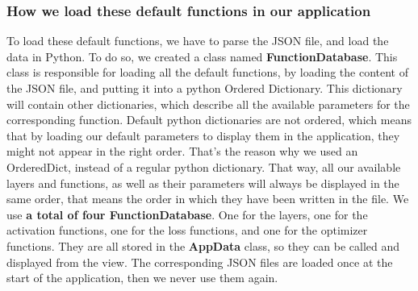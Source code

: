 \subsubsection{How we load these default functions in our application}
To load these default functions, we have to parse the JSON file, and load the data in Python.
To do so, we created a class named \textbf{FunctionDatabase}. This class is responsible for loading all the default functions, by loading the content of the JSON file, and putting it into a python Ordered Dictionary. This dictionary will contain other dictionaries, which describe all the available parameters for the corresponding function. Default python dictionaries are not ordered, which means that by loading our default parameters to display them in the application, they might not appear in the right order. That's the reason why we used an OrderedDict, instead of a regular python dictionary. That way, all our available layers and functions, as well as their parameters will always be displayed in the same order, that means the order in which they have been written in the file.
\newline We use \textbf{a total of four FunctionDatabase}. One for the layers, one for the activation functions, one for the loss functions, and one for the optimizer functions. They are all stored in the \textbf{AppData} class, so they can be called and displayed from the view.
The corresponding JSON files are loaded once at the start of the application, then we never use them again.

